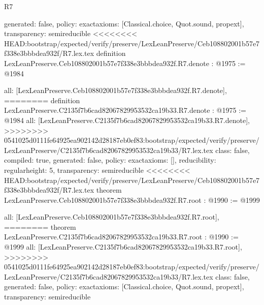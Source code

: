 \begin{lexlean}{R7}
\begin{coremodule}
{{{{{{{{{{{{  generated: false,
  policy: exact{axioms: [Classical.choice, Quot.sound, propext]},
  transparency: semireducible
}
<<<<<<<< HEAD:bootstrap/expected/verify/preserve/LexLeanPreserve/Ceb108802001b57e7f338e3bbbdea932f/R7.lex.tex
definition LexLeanPreserve.Ceb108802001b57e7f338e3bbbdea932f.R7.denote : @1975 := @1984 {
  all: [LexLeanPreserve.Ceb108802001b57e7f338e3bbbdea932f.R7.denote],
========
definition LexLeanPreserve.C2135f7b6cad82067829953532ca19b33.R7.denote : @1975 := @1984 {
  all: [LexLeanPreserve.C2135f7b6cad82067829953532ca19b33.R7.denote],
>>>>>>>> 0541025d0111fe64925ea902142d28187eb0ef83:bootstrap/expected/verify/preserve/LexLeanPreserve/C2135f7b6cad82067829953532ca19b33/R7.lex.tex
  class: false,
  compiled: true,
  generated: false,
  policy: exact{axioms: []},
  reducibility: regular{height: 5},
  transparency: semireducible
}
<<<<<<<< HEAD:bootstrap/expected/verify/preserve/LexLeanPreserve/Ceb108802001b57e7f338e3bbbdea932f/R7.lex.tex
theorem LexLeanPreserve.Ceb108802001b57e7f338e3bbbdea932f.R7.root : @1990 := @1999 {
  all: [LexLeanPreserve.Ceb108802001b57e7f338e3bbbdea932f.R7.root],
========
theorem LexLeanPreserve.C2135f7b6cad82067829953532ca19b33.R7.root : @1990 := @1999 {
  all: [LexLeanPreserve.C2135f7b6cad82067829953532ca19b33.R7.root],
>>>>>>>> 0541025d0111fe64925ea902142d28187eb0ef83:bootstrap/expected/verify/preserve/LexLeanPreserve/C2135f7b6cad82067829953532ca19b33/R7.lex.tex
  class: false,
  generated: false,
  policy: exact{axioms: [Classical.choice, Quot.sound, propext]},
  transparency: semireducible
}

}}}}}}}}}}}}}
\end{coremodule}
\end{lexlean}

